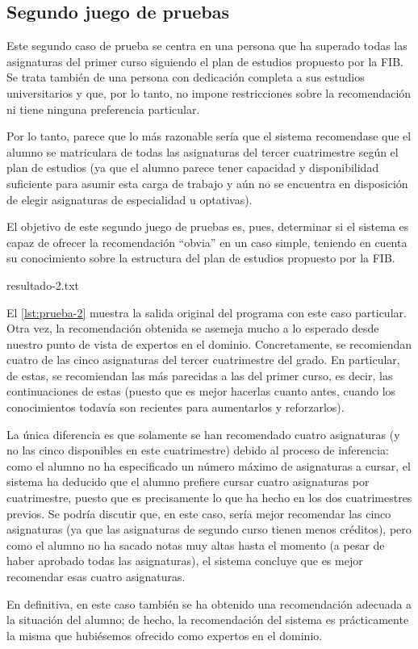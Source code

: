 
\subsection{Segundo juego de pruebas} \label{sec:prueba-2}

Este segundo caso de prueba se centra en una persona que ha superado todas 
las asignaturas del primer curso siguiendo el plan de estudios propuesto por 
la FIB. Se trata también de una persona con dedicación completa a sus estudios
universitarios y que, por lo tanto, no impone restricciones sobre la 
recomendación ni tiene ninguna preferencia particular.

Por lo tanto, parece que lo más razonable sería que el sistema recomendase 
que el alumno se matriculara de todas las asignaturas del tercer cuatrimestre 
según el plan de estudios (ya que el alumno parece tener capacidad y 
disponibilidad suficiente para asumir esta carga de trabajo y aún no se 
encuentra en disposición de elegir asignaturas de especialidad u optativas).

El objetivo de este segundo juego de pruebas es, pues, determinar si el 
sistema es capaz de ofrecer la recomendación ``obvia'' en un caso simple, 
teniendo en cuenta su conocimiento sobre la estructura del plan de estudios 
propuesto por la FIB.

%
    {resultado-2.txt}

El \autoref{lst:prueba-2} muestra la salida original del programa con este 
caso particular. Otra vez, la recomendación obtenida se asemeja mucho a lo 
esperado desde nuestro punto de vista de expertos en el dominio. 
Concretamente, se recomiendan cuatro de las cinco asignaturas del tercer 
cuatrimestre del grado. En particular, de estas, se recomiendan las más 
parecidas a las del primer curso, es decir, las continuaciones de estas 
(puesto que es mejor hacerlas cuanto antes, cuando los conocimientos todavía 
son recientes para aumentarlos y reforzarlos).

La única diferencia es que solamente se han recomendado cuatro asignaturas (y 
no las cinco disponibles en este cuatrimestre) debido al proceso de inferencia:
como el alumno no ha especificado un número máximo de asignaturas a cursar, 
el sistema ha deducido que el alumno prefiere cursar cuatro asignaturas por 
cuatrimestre, puesto que es precisamente lo que ha hecho en los dos 
cuatrimestres previos. Se podría discutir que, en este caso, sería mejor 
recomendar las cinco asignaturas (ya que las asignaturas de segundo curso 
tienen menos créditos), pero como el alumno no ha sacado notas muy altas hasta 
el momento (a pesar de haber aprobado todas las asignaturas), el sistema 
concluye que es mejor recomendar esas cuatro asignaturas.

En definitiva, en este caso también se ha obtenido una recomendación adecuada 
a la situación del alumno; de hecho, la recomendación del sistema es 
prácticamente la misma que hubiésemos ofrecido como expertos en el dominio.


